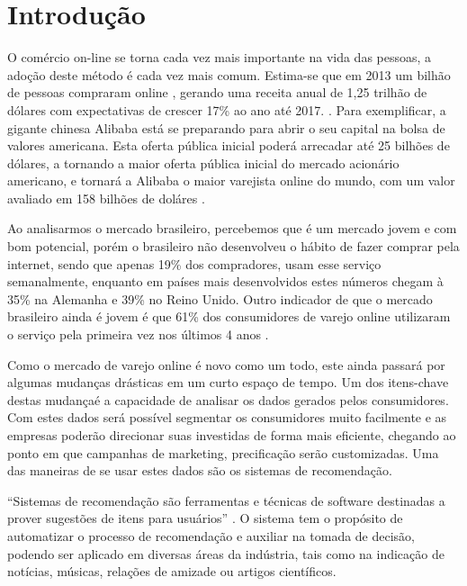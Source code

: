 \chapter[Introdução]{Introdução}
\label{chap:introducao}

O comércio on-line se torna cada vez mais importante na vida das pessoas, a adoção deste método é cada vez mais comum. Estima-se que em 2013 um bilhão de pessoas compraram online \cite{emarketerB2CEcommerceClimbs}, gerando uma receita anual de 1,25 trilhão de dólares com expectativas de crescer 17\% ao ano até 2017. \cite{emarketerGlobalB2CSales}. Para exemplificar, a gigante chinesa Alibaba está se preparando para abrir o seu capital na bolsa de valores americana. Esta oferta pública inicial poderá arrecadar até 25 bilhões de dólares, a tornando a maior oferta pública inicial do mercado acionário americano, e tornará a Alibaba o maior varejista online do mundo, com um valor avaliado em 158 bilhões de doláres \cite{ForbesAlibabaBoostsIPO}.

Ao analisarmos o mercado brasileiro, percebemos que é um mercado jovem e com bom potencial, porém o brasileiro não desenvolveu o hábito de fazer comprar pela internet, sendo que apenas 19\% dos compradores, usam esse serviço semanalmente, enquanto em países mais desenvolvidos estes números chegam à 35\% na Alemanha e 39\% no Reino Unido. Outro indicador de que o mercado brasileiro ainda é jovem é que 61\% dos consumidores de varejo online utilizaram o serviço pela primeira vez nos últimos 4 anos \cite{PWCTotalRetail}.

Como o mercado de varejo online é novo como um todo, este ainda passará por algumas mudanças drásticas em um curto espaço de tempo. Um dos itens-chave destas mudançaé a capacidade de analisar os dados gerados pelos consumidores. Com estes dados será possível segmentar os consumidores muito facilmente e as empresas poderão direcionar suas investidas de forma mais eficiente, chegando ao ponto em que campanhas de marketing, precificação serão customizadas. \cite{BCGThegotomarketrevolution} Uma das maneiras de se usar estes dados são os sistemas de recomendação.

``Sistemas de recomendação são ferramentas e técnicas de software destinadas a prover sugestões de itens para usuários'' \cite{ricci2011introduction-chap1}. O sistema tem o propósito de automatizar o processo de recomendação e auxiliar na tomada de decisão, podendo ser aplicado em diversas áreas da indústria, tais como na indicação de notícias, músicas, relações de amizade ou artigos científicos.

